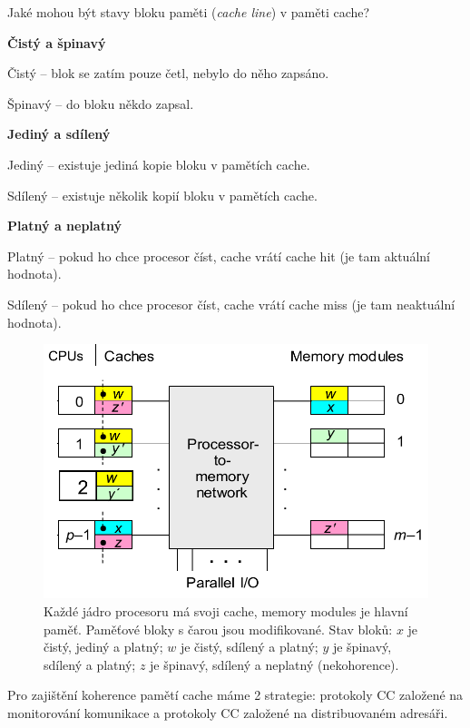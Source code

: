\begin{compactitem}
    \item Jaké mohou být stavy bloku paměti (\textit{cache line}) v paměti cache? \begin{compactitem}
        \item \textbf{Čistý a špinavý} \begin{compactitem}
            \item Čistý -- blok se zatím pouze četl, nebylo do něho zapsáno.
            \item Špinavý -- do bloku někdo zapsal.
        \end{compactitem}
        \item \textbf{Jediný a sdílený} \begin{compactitem}
            \item Jediný -- existuje jediná kopie bloku v pamětích cache.
            \item Sdílený -- existuje několik kopií bloku v pamětích cache.
        \end{compactitem}
        \item \textbf{Platný a neplatný} \begin{compactitem}
            \item Platný -- pokud ho chce procesor číst, cache vrátí cache hit (je tam aktuální hodnota).
            \item Sdílený -- pokud ho chce procesor číst, cache vrátí cache miss (je tam neaktuální hodnota).
        \end{compactitem}

        \begin{figure}[H]
            \centering
            \includegraphics[width=0.75\linewidth]{typy_bloku_dat_pameti_cache.pdf}
            \caption{Každé jádro procesoru má svoji cache, memory modules je hlavní paměť. Paměťové bloky s čarou jsou modifikované. Stav bloků: $x$ je čistý, jediný a platný; $w$ je čistý, sdílený a platný; $y$ je špinavý, sdílený a platný; $z$ je špinavý, sdílený a neplatný (nekohorence).}
        \end{figure}

        \item Pro zajištění koherence pamětí cache máme 2 strategie: protokoly CC založené na monitorování komunikace a protokoly CC založené na distribuovaném adresáři.
    \end{compactitem}
\end{compactitem}

